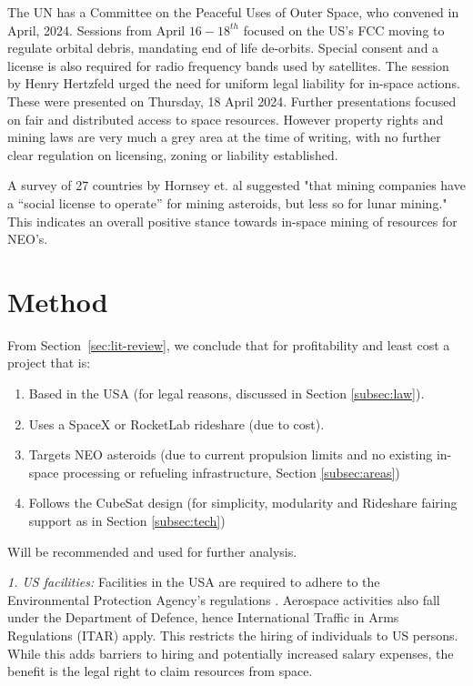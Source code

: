 \documentclass[conference]{IEEEtran}
\begin{document}
The UN has a Committee on the Peaceful Uses of Outer Space, who convened in April, 2024. Sessions from April $16-18^{th}$ \cite{united-nations-no-date} focused on the US's FCC moving to regulate orbital debris, mandating end of life de-orbits. Special consent and a license is also required for radio frequency bands used by satellites. The session by Henry Hertzfeld urged the need for uniform legal liability for in-space actions. These were presented on Thursday, 18 April 2024. Further presentations focused on fair and distributed access to space resources. However property rights and mining laws are very much a grey area at the time of writing, with no further clear regulation on licensing, zoning or liability established.

A survey of 27 countries by Hornsey et. al \cite{su14074119} suggested "that mining companies have a “social license to operate” for mining asteroids, but less so for lunar mining." This indicates an overall positive stance towards in-space mining of resources for NEO's.

\section{Method}\label{sec:method}
From Section~\ref{sec:lit-review}, we conclude that for profitability and least cost a project that is:

\begin{enumerate}
    \item Based in the USA (for legal reasons, discussed in Section \ref{subsec:law}).
    \item Uses a SpaceX or RocketLab rideshare (due to cost).
    \item Targets NEO asteroids (due to current propulsion limits and no existing in-space processing or refueling infrastructure, Section \ref{subsec:areas})
    \item Follows the CubeSat design (for simplicity, modularity and Rideshare fairing support as in Section \ref{subsec:tech})
\end{enumerate}

Will be recommended and used for further analysis.

\textit{1. US facilities:}
Facilities in the USA are required to adhere to the Environmental Protection Agency's regulations \cite{epa-2024}. Aerospace activities also fall under the Department of Defence, hence International Traffic in Arms Regulations (ITAR) apply. This restricts the hiring of individuals to US persons. While this adds barriers to hiring and potentially increased salary expenses, the benefit is the legal right to claim resources from space.
\end{document}

